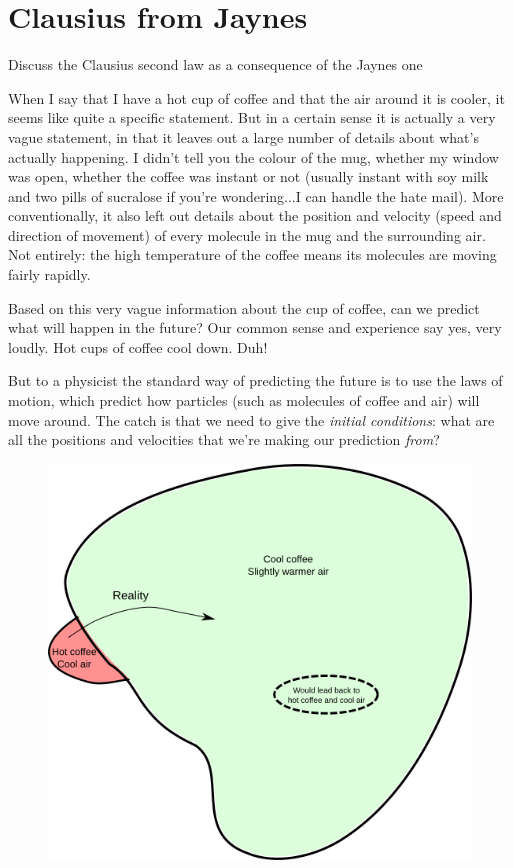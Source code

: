 \documentclass[a4paper, 12pt]{article}
\begin{document}
\section*{Clausius from Jaynes}
Discuss the Clausius second law as a consequence of the Jaynes one

When I say that I have a hot cup of coffee and that the air around it is cooler,
it seems like quite a specific statement. But in a certain sense it is actually
a very vague statement, in that it leaves out a large number of details about
what's actually happening. I didn't tell you the colour of the mug, whether
my window was open, whether the coffee was instant or not (usually instant with
soy milk and two pills of sucralose if you're wondering...I can handle the hate mail). More conventionally, it also left out details about the position and
velocity (speed and direction of movement) of every molecule in the mug and
the surrounding air. Not entirely: the high temperature of the coffee means its
molecules are moving fairly rapidly.

Based on this very vague information about the cup of coffee, can we predict
what will happen in the future? Our common sense and experience say yes, very
loudly. Hot cups of coffee cool down. Duh!

But to a physicist the standard way of predicting the future is to use
the laws of motion, which predict how particles (such as molecules of coffee
and air) will move around. The catch is that we need to give the {\it initial
conditions}: what are all the positions and velocities that we're making our
prediction {\it from}?

\begin{figure}
\centering
\includegraphics[scale=0.6]{diagrams.png}
\end{figure}
\end{document}
